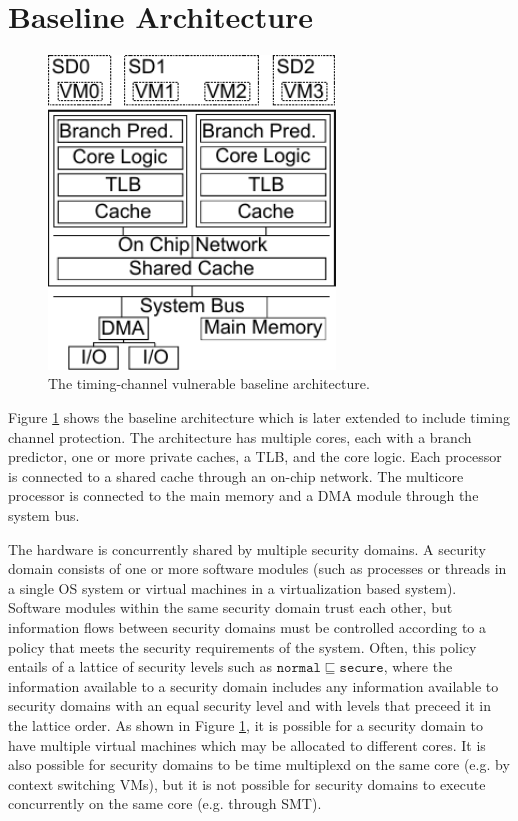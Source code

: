 \section{Baseline Architecture}

    \begin{figure}
        \begin{center}
            \includegraphics[width=3in]{figs/baseline.pdf}
            \caption{The timing-channel vulnerable baseline architecture.}
            \label{fig:baseline}
        \end{center}
    \end{figure}

    Figure \ref{fig:baseline} shows the baseline architecture which is later 
    extended to include timing channel protection. The architecture has 
    multiple cores, each with a branch predictor, one or more private caches, a 
    TLB, and the core logic. Each processor is connected to a shared cache 
    through an on-chip network. The multicore processor is connected to the 
    main memory and a DMA module through the system bus. 

    The hardware is concurrently shared by multiple security domains. A 
    security domain consists of one or more software modules (such as processes 
    or threads in a single OS system or virtual machines in a virtualization 
    based system). Software modules within the same security domain trust each 
    other, but information flows between security domains must be controlled 
    according to a policy that meets the security requirements of the system.
    Often, this policy entails of a lattice of security levels such as 
    $\mathtt{normal} \sqsubseteq \mathtt{secure}$, where the information 
    available to a security domain includes any information available to 
    security domains with an equal security level and with levels that preceed 
    it in the lattice order. As shown in Figure \ref{fig:baseline}, it is 
    possible for a security domain to have multiple virtual machines which may 
    be allocated to different cores. It is also possible for security domains 
    to be time multiplexd on the same core (e.g.  by context switching VMs), 
    but it is not possible for security domains to execute concurrently on the 
    same core (e.g. through SMT).

